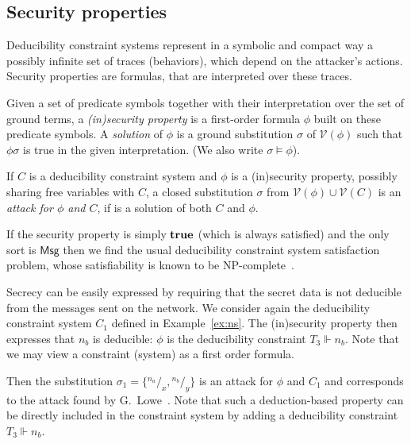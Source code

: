 \documentclass[acmtocl,acmnow]{acmtrans2m}
\newcommand{\var}{\mathcal{V}}
\newcommand{\subst}[2]{{}^{#2}\!/_{\!#1}}
\newcommand{\ttrue}{\mathsf{\bf true}}
\newcommand{\term}{\mathsf{Msg}}
\newcommand{\dedcons}[1]{deducibility constraint}
\newcommand{\dedsys}[1]{deducibility constraint system}
\begin{document}
\subsection{Security properties}\label{sec:property}

Deducibility constraint systems
represent in a symbolic and compact way a
possibly infinite set of traces (behaviors), which depend on the 
attacker's actions.
Security properties are formulas, that are interpreted over these 
traces. 



\begin{definition}
Given a set of predicate symbols together with their interpretation over
the set of ground terms,
a \emph{(in)security property} is a first-order formula $\phi$ built on these predicate
symbols. 
A \emph{solution} of $\phi$ is a ground substitution $\sigma$
of $\var(\phi)$ such that $\phi\sigma$ is true in the given interpretation.
(We also write $\sigma \models \phi$).


If $C$ is a \dedsys{} and $\phi$ is a (in)security property,
possibly sharing free variables with $C$,
a closed substitution $\sigma$ from $\var(\phi)\cup \var(C)$ is an \emph{attack
for $\phi$ and  $C$}, if is a solution of both $C$ and $\phi$. 


\end{definition}



\begin{example}\label{ex:classic}
If the security property is simply $\ttrue$ (which is always satisfied)
and the only sort is $\term$ then we find the usual
\dedsys{} satisfaction problem, whose satisfiability
 is known to be NP-complete~\cite{RT03TCS}.
\end{example}


\begin{example}\label{ex:secrecy}
Secrecy can be easily expressed by requiring that the secret data is not
deducible from the messages sent on the network.
We consider again the \dedsys{} $C_1$ defined in
Example~\ref{ex:ns}.
The (in)security property then expresses that $n_b$ is deducible:
$\phi$ is the \dedcons{} $T_3\Vdash n_b$. 
Note that we may view a constraint (system) as a first order formula.



Then the substitution $\sigma_1 = \{\subst{x}{n_a},\subst{y}{n_b}\}$
is an attack for $\phi$ and $C_1$ 
and corresponds to the attack found by
G.~Lowe~\cite{lowe96breaking}.
Note
that such a deduction-based property can be directly included in
the constraint system by adding a \dedcons{} $T_3\Vdash n_b$.
\end{example}
\end{document}
